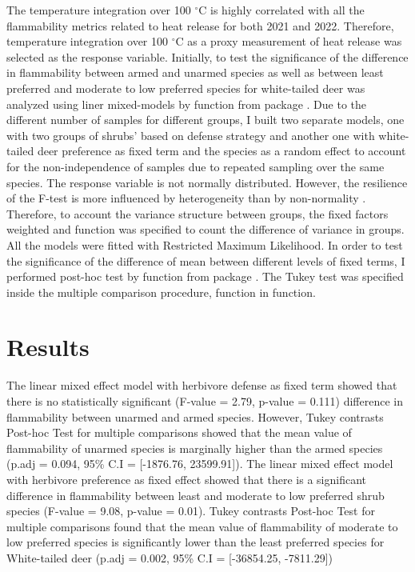 \documentclass[12pt]{report}
\begin{document}
The temperature integration over 100 $^{\circ}$C is highly correlated with all the flammability metrics related to heat release for both 2021 and 2022. Therefore, temperature integration over 100 $^{\circ}$C as a proxy measurement of heat release was selected as the response variable. Initially, to test the significance of the difference in flammability between armed and unarmed species as well as between least preferred and moderate to low preferred species for white-tailed deer was analyzed using liner mixed-models by  function from  package \citep{pinheiro2017package}. Due to the different number of samples for different groups, I  built two separate models, one with two groups of shrubs' based on defense strategy and another one with white-tailed deer preference as fixed term and the species as a random effect to account for the non-independence of samples due to repeated sampling over the same species. The response variable is not normally distributed. However, the resilience of the F-test is more influenced by heterogeneity than by non-normality \citep{blanca2017non}. Therefore, to account the variance structure between groups, the fixed factors weighted and  function was specified to count the difference of variance in groups. All the models were fitted with Restricted Maximum Likelihood. In order to test the significance of the difference of mean between different levels of fixed terms, I performed post-hoc test by  function from  package \citep{hothorn2016package}. The Tukey test was specified inside the multiple comparison procedure,  function in  function.

\section{Results}

The linear mixed effect model with herbivore defense as fixed term showed that there is no statistically significant (F-value = 2.79, p-value = 0.111) difference in flammability between unarmed and armed species. However, Tukey contrasts Post-hoc Test for multiple comparisons showed that the mean value of flammability of unarmed species is marginally higher than the armed species (p.adj = 0.094, 95\% C.I = [-1876.76, 23599.91]). The linear mixed effect model with herbivore preference as fixed effect showed that there is a significant difference in flammability between least and moderate to low preferred shrub species (F-value = 9.08, p-value = 0.01). Tukey contrasts Post-hoc Test for multiple comparisons found that the mean value of flammability of moderate to low  preferred species is significantly lower than the least preferred species for White-tailed deer (p.adj = 0.002, 95\% C.I = [-36854.25, -7811.29])\\
\end{document}
